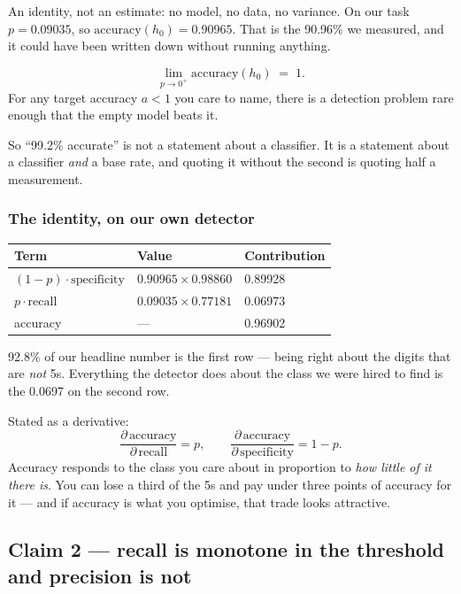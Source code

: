 \documentclass[11pt,a4paper]{article}
\begin{document}
An identity, not an estimate: no model, no data, no variance. On our task
$p = 0.09035$, so $\text{accuracy}(h_0) = 0.90965$. That is the 90.96\% we
measured, and it could have been written down without running anything.

\begin{failbox}[title={Failure condition --- accuracy is unbounded above by uselessness}]
\[ \lim_{p \to 0^{+}} \text{accuracy}(h_0) \;=\; 1. \]
For any target accuracy $a < 1$ you care to name, there is a detection problem
rare enough that the empty model beats it.

So ``99.2\% accurate'' is not a statement about a classifier. It is a statement
about a classifier \emph{and} a base rate, and quoting it without the second is
quoting half a measurement.
\end{failbox}

\subsubsection{The identity, on our own detector}

\begin{center}
\small
\begin{tabular}{lll}
\toprule
\textbf{Term} & \textbf{Value} & \textbf{Contribution} \\
\midrule
$(1-p)\cdot\text{specificity}$ & $0.90965 \times 0.98860$ & 0.89928 \\
$p\cdot\text{recall}$          & $0.09035 \times 0.77181$ & 0.06973 \\
accuracy                       & ---                      & 0.96902 \\
\bottomrule
\end{tabular}
\end{center}

92.8\% of our headline number is the first row --- being right about the digits
that are \emph{not} 5s. Everything the detector does about the class we were
hired to find is the 0.0697 on the second row.

Stated as a derivative:
\[ \frac{\partial\,\text{accuracy}}{\partial\,\text{recall}} = p,
   \qquad
   \frac{\partial\,\text{accuracy}}{\partial\,\text{specificity}} = 1-p. \]
Accuracy responds to the class you care about in proportion to \emph{how little
of it there is}. You can lose a third of the 5s and pay under three points of
accuracy for it --- and if accuracy is what you optimise, that trade looks
attractive.

\subsection{Claim 2 --- recall is monotone in the threshold and precision is not}
\end{document}
